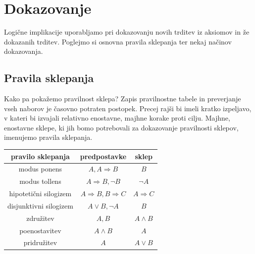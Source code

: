 \documentclass[11pt,paper=b5,DIV=13,headinclude,footinclude]{scrbook}
\newcommand{\komentar}[1]{\textcolor{red}{[#1]}} %
\begin{document}











\newpage 

\section{Dokazovanje}

Logične implikacije uporabljamo pri dokazovanju novih trditev iz aksiomov in že dokazanih trditev.
Poglejmo si osnovna  pravila sklepanja ter nekaj načinov dokazovanja.

\subsection{Pravila sklepanja}
Kako pa pokažemo pravilnost sklepa? Zapis
pravilnostne tabele in preverjanje vseh naborov je časovno potraten postopek. Precej
rajši bi imeli kratko izpeljavo, v kateri bi izvajali relativno enostavne, majhne korake
proti cilju.
Majhne, enostavne sklepe, ki jih bomo potrebovali za dokazovanje pravilnosti sklepov,
imenujemo pravila sklepanja.


\begin{center}
\begin{tabular}{|c|c|c|}
	\hline 
	pravilo sklepanja & predpostavke & sklep\\
	\hline 
	\hline 
	modus ponens & $A,A\Rightarrow B$ & $B$\\
	\hline 
	modus tollens & $A\Rightarrow B,\neg B$ & $\neg A$\\
	\hline 
	hipoteti\v{c}ni silogizem & $A\Rightarrow B,B\Rightarrow C$ & $A\Rightarrow C$\\
	\hline 
	disjunktivni silogizem & $A\vee B,\neg A$ & $B$\\
	\hline 
	združitev  & $A,B$ & $A\wedge B$\\
	\hline 
	poenostavitev & $A\wedge B$ & $A$\\
	\hline 
	pridružitev & $A$ & $A\vee B$\\
	\hline 
\end{tabular}
\end{center}
\end{document}

